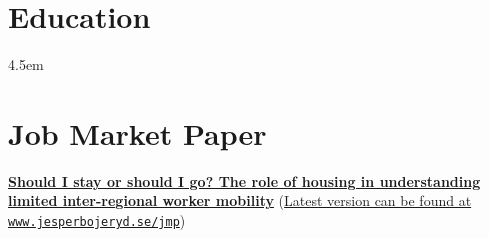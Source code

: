 \documentclass{clean_CV}
\newcommand{\datetabspace}{4.5em}
\begin{document}
\section{Education}

\begin{datetabular}{\datetabspace}





\end{datetabular}



\section{Job Market Paper}{%
\href{https://www.jesperbojeryd.se/jmp}{\textbf{Should I stay or should I go? The role of housing in understanding limited inter-regional worker mobility}} (\href{https://www.jesperbojeryd.se/jmp}{Latest version can be found at \texttt{www.jesperbojeryd.se/jmp}})}
\end{document}
